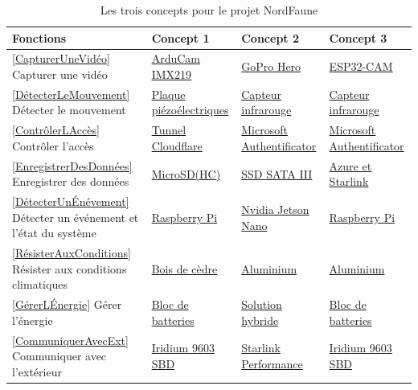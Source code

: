 \begin{table}[htp]
\centering
\caption{Les trois concepts pour le projet NordFaune}
\label{tab:concepts_nordfaune}

\begin{tabular}{|L{6cm}|L{3cm}|L{3cm}|L{3cm}|}
\hline
\textbf{Fonctions} & \textbf{Concept 1} & \textbf{Concept 2} & \textbf{Concept 3} \\
\hline


\ref{CapturerUneVidéo} Capturer une vidéo
    & \hyperref[sec:arduc]{ArduCam IMX219}
    & \hyperref[sec:gopro]{GoPro Hero}
    & \hyperref[sec:esp32]{ESP32-CAM}
\\
\hline

\ref{DétecterLeMouvement} Détecter le mouvement
    & \hyperref[sec:plaque]{Plaque piézoélectriques}
    & \hyperref[sec:capte]{Capteur infrarouge}
    & \hyperref[sec:capte]{Capteur infrarouge}
\\
\hline

\ref{ContrôlerLAccès} Contrôler l'accès
    & \hyperref[sec:tunne]{Tunnel Cloudflare}
    & \hyperref[sec:micro]{Microsoft Authentificator}
    & \hyperref[sec:tunne]{Microsoft Authentificator}
\\
\hline

\ref{EnregistrerDesDonnées} Enregistrer des données
    & \hyperref[sec:cartesd]{MicroSD(HC)}
    & \hyperref[sec:ssd]{SSD SATA III}
    & \hyperref[sec:azsta]{Azure et Starlink}
\\
\hline

\ref{DétecterUnÉnévement} Détecter un événement et l'état du système
    & \hyperref[sec:raspb]{Raspberry Pi}
    & \hyperref[sec:nano]{Nvidia Jetson Nano}
    & \hyperref[sec:raspb]{Raspberry Pi}
\\
\hline

\ref{RésisterAuxConditions} Résister aux conditions climatiques
    & \hyperref[sec:bois]{Bois de cèdre}
    & \hyperref[sec:alumi]{Aluminium}
    & \hyperref[sec:alumi]{Aluminium}
\\
\hline

\ref{GérerLÉnergie} Gérer l'énergie
    & \hyperref[sec:bloc]{Bloc de batteries}
    & \hyperref[sec:hybri]{Solution hybride}
    & \hyperref[sec:bloc]{Bloc de batteries}
\\
\hline

\ref{CommuniquerAvecExt} Communiquer avec l'extérieur
    & \hyperref[sec:iridi]{Iridium 9603 SBD}
    & \hyperref[sec:starl]{Starlink Performance}
    & \hyperref[sec:iridi]{Iridium 9603 SBD}
\\

\hline
\end{tabular}
\end{table}


